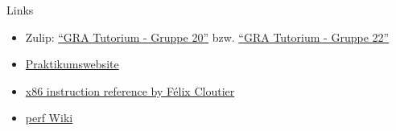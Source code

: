 \begin{frame}[fragile, c]{Links}{}
	\begin{itemize}
		\item Zulip: \href{https://zulip.in.tum.de/#narrow/stream/2267-GRA-Tutorium---Gruppe-20}{\enquote{GRA Tutorium - Gruppe 20}}
		      bzw. \href{https://zulip.in.tum.de/#narrow/stream/2269-GRA-Tutorium---Gruppe-22}{\enquote{GRA Tutorium - Gruppe 22}}
		\item \href{https://gra.caps.in.tum.de}{Praktikumswebsite}
		\item \href{https://www.felixcloutier.com/x86/}{x86 instruction reference by Félix Cloutier}
		\item \href{https://perf.wiki.kernel.org/}{perf Wiki}
	\end{itemize}
\end{frame}

\maketitle


